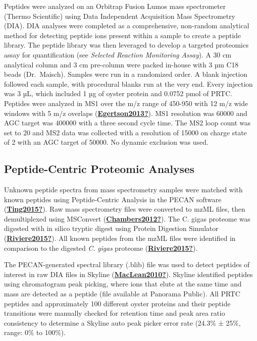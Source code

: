 \documentclass [11pt, proquest] {uwthesis}[2015/03/03]
\begin{document}
Peptides were analyzed on an Orbitrap Fusion Lumos mass spectrometer (Thermo Scientific) using Data Independent Acquisition Mass Spectrometry (DIA). DIA analyses were completed as a comprehensive, non-random analytical method for detecting peptide ions present within a sample to create a peptide library. The peptide library was then leveraged to develop a targeted proteomics assay for quantification (see \emph{Selected Reaction Monitoring Assay}). A 30 cm analytical column and 3 cm pre-column were packed in-house with 3 µm C18 beads (Dr.~Maisch). Samples were run in a randomized order. A blank injection followed each sample, with procedural blanks run at the very end. Every injection was 3 µL, which included 1 µg of oyster protein and 0.0752 pmol of PRTC. Peptides were analyzed in MS1 over the m/z range of 450-950 with 12 m/z wide windows with 5 m/z overlaps (\protect\hyperlink{ref-Egertson2013}{\textbf{Egertson2013?}}). MS1 resolution was 60000 and AGC target was 400000 with a three second cycle time. The MS2 loop count was set to 20 and MS2 data was collected with a resolution of 15000 on charge state of 2 with an AGC target of 50000. No dynamic exclusion was used.

\hypertarget{peptide-centric-proteomic-analyses}{%
\subsection{Peptide-Centric Proteomic Analyses}\label{peptide-centric-proteomic-analyses}}

Unknown peptide spectra from mass spectrometry samples were matched with known peptides using Peptide-Centric Analysis in the PECAN software (\protect\hyperlink{ref-Ting2015}{\textbf{Ting2015?}}). Raw mass spectrometry files were converted to mzML files, then demultiplexed using MSConvert (\protect\hyperlink{ref-Chambers2012}{\textbf{Chambers2012?}}). The C. gigas proteome was digested with in silico tryptic digest using Protein Digestion Simulator (\protect\hyperlink{ref-Riviere2015}{\textbf{Riviere2015?}}). All known peptides from the mzML files were identified in comparison to the digested \emph{C. gigas} proteome (\protect\hyperlink{ref-Riviere2015}{\textbf{Riviere2015?}}).

The PECAN-generated spectral library (.blib) file was used to detect peptides of interest in raw DIA files in Skyline (\protect\hyperlink{ref-MacLean2010}{\textbf{MacLean2010?}}). Skyline identified peptides using chromatogram peak picking, where ions that elute at the same time and mass are detected as a peptide (file available at Panorama Public). All PRTC peptides and approximately 100 different oyster proteins and their peptide transitions were manually checked for retention time and peak area ratio consistency to determine a Skyline auto peak picker error rate (24.3\% ± 25\%, range: 0\% to 100\%).
\end{document}
